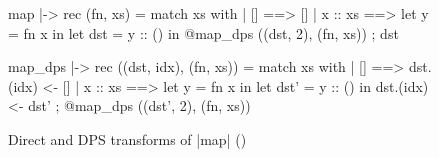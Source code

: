 \begin{figure}[tp]
\begin{minipage}{.40\columnwidth}
\begin{Datalang}
map |-> rec (fn, xs) =
  match xs with
  | [] ==> 
      []
  | x :: xs ==>
      let y = fn x in
      let dst = y :: () in
      @map_dps ((dst, 2), (fn, xs)) ;
      dst
\end{Datalang}
\end{minipage}
\hfill
\begin{minipage}{.52\columnwidth}
\begin{Datalang}
map_dps |-> rec ((dst, idx), (fn, xs)) =
  match xs with
  | [] ==> 
      dst.(idx) <- []
  | x :: xs ==>
      let y = fn x in
      let dst' = y :: () in
      dst.(idx) <- dst' ;
      @map_dps ((dst', 2), (fn, xs))
\end{Datalang}
\end{minipage}
\caption{Direct and DPS transforms of \datalang|map| (\DataLang)}
\label{fig:map_tmc}
\end{figure}